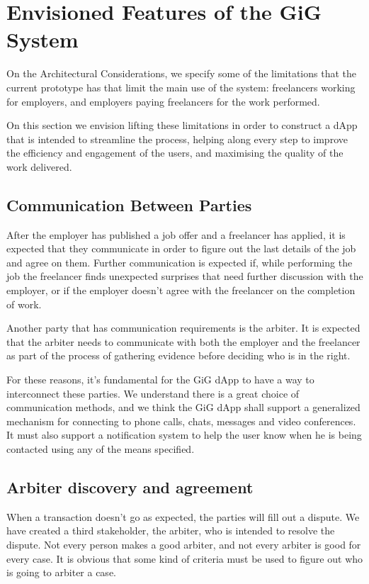 \documentclass{article}
\begin{document}
\section{Envisioned Features of the GiG System}
On the Architectural Considerations, we specify some of the limitations that the current prototype has that limit the main use of the system: freelancers working for employers, and employers paying freelancers for the work performed.

On this section we envision lifting these limitations in order to construct a dApp that is intended to streamline the process, helping along every step to improve the efficiency and engagement of the users, and maximising the quality of the work delivered.

\subsection{Communication Between Parties}

After the employer has published a job offer and a freelancer has applied, it is expected that they communicate in order to figure out the last details of the job and agree on them. Further communication is expected if, while performing the job the freelancer finds unexpected surprises that need further discussion with the employer, or if the employer doesn't agree with the freelancer on the completion of work.

Another party that has communication requirements is the arbiter. It is expected that the arbiter needs to communicate with both the employer and the freelancer as part of the process of gathering evidence before deciding who is in the right.

For these reasons, it's fundamental for the GiG dApp to have a way to interconnect these parties. We understand there is a great choice of communication methods, and we think the GiG dApp shall support a generalized mechanism for connecting to phone calls, chats, messages and video conferences. It must also support a notification system to help the user know when he is being contacted using any of the means specified.

\subsection{Arbiter discovery and agreement}

When a transaction doesn't go as expected, the parties will fill out a dispute. We have created a third stakeholder, the arbiter, who is intended to resolve the dispute. Not every person makes a good arbiter, and not every arbiter is good for every case. It is obvious that some kind of criteria must be used to figure out who is going to arbiter a case.
\end{document}
